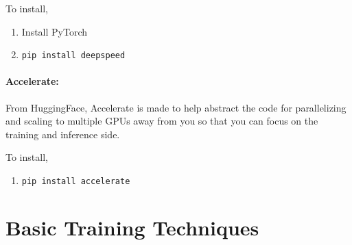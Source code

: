 To install,
\begin{enumerate}
	\item Install PyTorch
	\item \texttt{pip install deepspeed}
\end{enumerate}

\paragraph{Accelerate:} From HuggingFace, Accelerate is made to help abstract the code for parallelizing and scaling to multiple GPUs away from you so that you can focus on the training and inference side. 

To install,
\begin{enumerate}
	\item \texttt{pip install accelerate}
\end{enumerate}

\section{Basic Training Techniques}

